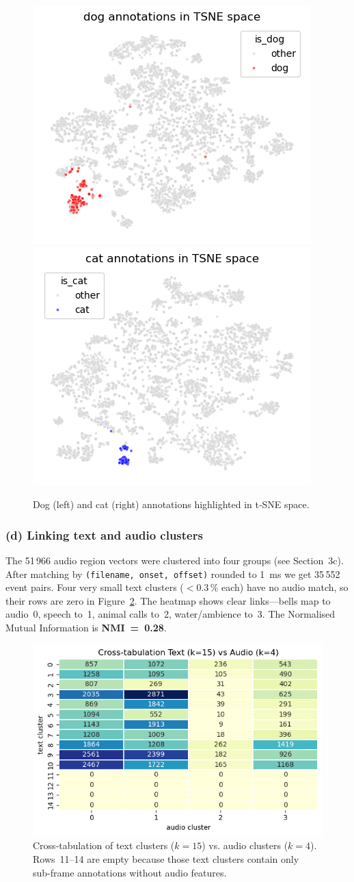 \documentclass{article}
\begin{document}
\begin{figure}[h]
  \centering
  \includegraphics[width=.42\linewidth]{figs_tang/04_dog_annotations_in_tsne_space.png}\hfill
  \includegraphics[width=.42\linewidth]{figs_tang/04_cat_annotations_in_tsne_space.png}
  \caption{Dog (left) and cat (right) annotations highlighted in t‑SNE space.}
  \label{fig:dogcat_tsne}
\end{figure}

\subsubsection{(d) Linking text and audio clusters}
The 51\,966 audio region vectors were clustered into four groups (see Section~3c). After matching by \texttt{(filename, onset, offset)} rounded to 1 ms we get 35\,552 event pairs. Four very small text clusters ($<0.3$\,\% each) have no audio match, so their rows are zero in Figure~\ref{fig:text_audio_heat}. The heatmap shows clear links—bells map to audio 0, speech to 1, animal calls to 2, water/ambience to 3. The Normalised Mutual Information is \textbf{NMI = 0.28}.

\begin{figure}[h]
  \centering
  \includegraphics[width=.7\linewidth]{figs_tang/04_text_audio_heatmap_k15.png}
  \caption{Cross‑tabulation of text clusters ($k=15$) vs. audio clusters ($k=4$). Rows 11–14 are empty because those text clusters contain only sub‑frame annotations without audio features.}
  \label{fig:text_audio_heat}
\end{figure}
\end{document}
